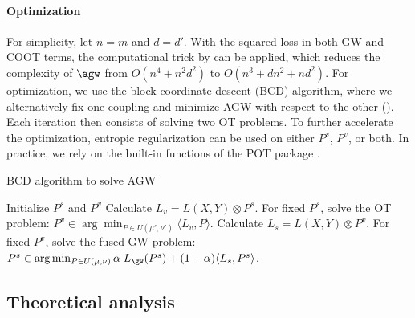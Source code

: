 \paragraph{Optimization} For simplicity, let $n = m$ and $d = d'$.
With the squared loss in both GW and COOT terms, the computational trick by \citep{Peyre16}
can be applied, which reduces the complexity of $\agw$ from $O(n^4 + n^2 d^2)$
to $O(n^3 + dn^2 + nd^2)$. For optimization, we use the block coordinate descent (BCD) algorithm,
where we alternatively fix one coupling and minimize AGW with respect to the other ().
Each iteration then consists of solving two OT problems. To further accelerate the optimization,
entropic regularization can be used \citep{Cuturi13} on either $P^s$, $P^v$, or both.
In practice, we rely on the built-in functions of the POT package \citep{Flamary21}.

\begin{algorithm}[!t]
    \caption{BCD algorithm to solve AGW \label{alg:bcd_agw}}
    \begin{algorithmic}[t]
      \STATE Initialize $P^s$ and $P^v$
      \REPEAT
      \STATE Calculate $L_v = L(X, Y) \otimes P^s$.
      \STATE For fixed $P^s$, solve the OT problem:
      $P^v \in \arg\min_{P \in U(\mu', \nu')} \langle L_v, P \rangle$.
      \STATE Calculate $L_s = L(X, Y) \otimes P^v$.
      \STATE For fixed $P^v$, solve the fused GW problem:
      $P^s \in \arg\min_{P \in U(\mu, \nu)} \alpha \; L_{\gw} (P^s)
      + (1-\alpha) \langle L_s, P^s \rangle$.
\end{algorithmic}
\end{algorithm}

\subsection{Theoretical analysis}

